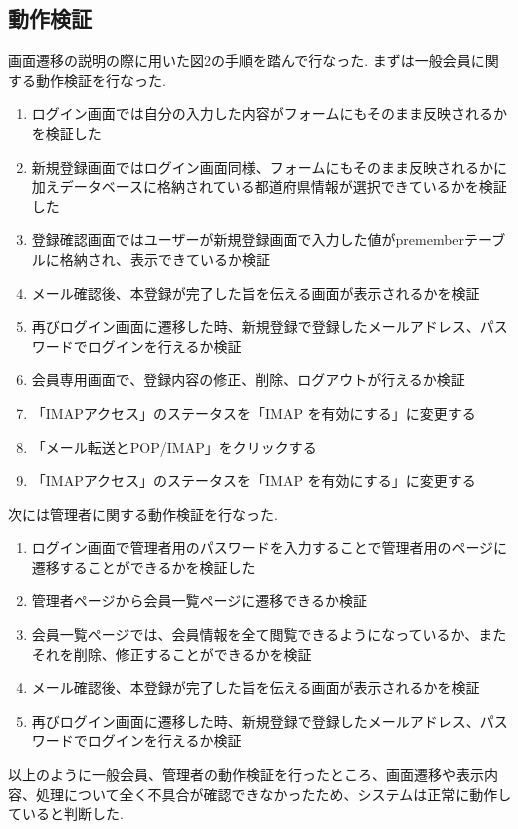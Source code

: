 \documentclass[submit,techrep]{ipsj}
\begin{document}
\subsection{動作検証}
画面遷移の説明の際に用いた図2の手順を踏んで行なった.
まずは一般会員に関する動作検証を行なった.
\begin{enumerate}
  \item ログイン画面では自分の入力した内容がフォームにもそのまま反映されるかを検証した
  \item 新規登録画面ではログイン画面同様、フォームにもそのまま反映されるかに加えデータベースに格納されている都道府県情報が選択できているかを検証した
  \item 登録確認画面ではユーザーが新規登録画面で入力した値がprememberテーブルに格納され、表示できているか検証
  \item メール確認後、本登録が完了した旨を伝える画面が表示されるかを検証
  \item 再びログイン画面に遷移した時、新規登録で登録したメールアドレス、パスワードでログインを行えるか検証
   \item 会員専用画面で、登録内容の修正、削除、ログアウトが行えるか検証
  \item 「IMAPアクセス」のステータスを「IMAP を有効にする」に変更する
   \item 「メール転送とPOP/IMAP」をクリックする
  \item 「IMAPアクセス」のステータスを「IMAP を有効にする」に変更する
  \end{enumerate}
  
 次には管理者に関する動作検証を行なった.
\begin{enumerate}
  \item ログイン画面で管理者用のパスワードを入力することで管理者用のページに遷移することができるかを検証した
  \item 管理者ページから会員一覧ページに遷移できるか検証
  \item 会員一覧ページでは、会員情報を全て閲覧できるようになっているか、またそれを削除、修正することができるかを検証
  \item メール確認後、本登録が完了した旨を伝える画面が表示されるかを検証
  \item 再びログイン画面に遷移した時、新規登録で登録したメールアドレス、パスワードでログインを行えるか検証
  \end{enumerate}
  
  以上のように一般会員、管理者の動作検証を行ったところ、画面遷移や表示内容、処理について全く不具合が確認できなかったため、システムは正常に動作していると判断した.
  
\end{document}
